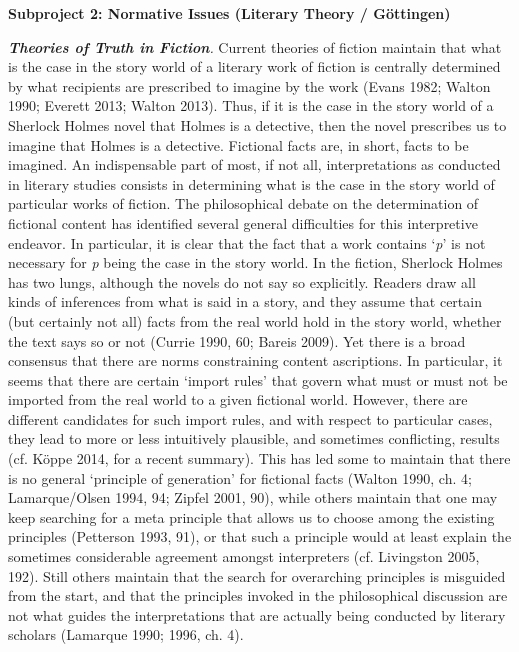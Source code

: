 
\vspace{.2cm}
\noindent\textbf{Subproject 2: Normative Issues (Literary Theory / G\"ottingen)}
\vspace{.2cm}

\noindent\textbf{\emph{Theories of Truth in Fiction}}\emph{.} Current theories of fiction maintain that what is the case in the story world of a literary work of fiction is centrally determined by what recipients are prescribed to imagine by the work (Evans 1982; Walton 1990; Everett 2013; Walton 2013). Thus, if it is the case in the story world of a Sherlock Holmes novel that Holmes is a detective, then the novel prescribes us to imagine that Holmes is a detective. Fictional facts are, in short, facts to be imagined. An indispensable part of most, if not all, interpretations as conducted in literary studies consists in determining what is the case in the story world of particular works of fiction. The philosophical debate on the determination of fictional content has identified several general difficulties for this interpretive endeavor. In particular, it is clear that the fact that a work contains `\emph{p}' is not necessary for \emph{p} being the case in the story world. In the fiction, Sherlock Holmes has two lungs, although the novels do not say so explicitly. Readers draw all kinds of inferences from what is said in a story, and they assume that certain (but certainly not all) facts from the real world hold in the story world, whether the text says so or not (Currie 1990, 60; Bareis 2009). Yet there is a broad consensus that there are norms constraining content ascriptions. In particular, it seems that there are certain `import rules' that govern what must or must not be imported from the real world to a given fictional world. However, there are different candidates for such import rules, and with respect to particular cases, they lead to more or less intuitively plausible, and sometimes conflicting, results (cf. K\"oppe 2014, for a recent summary). This has led some to maintain that there is no general `principle of generation' for fictional facts (Walton 1990, ch. 4; Lamarque/Olsen 1994, 94; Zipfel 2001, 90), while others maintain that one may keep searching for a meta principle that allows us to choose among the existing principles (Petterson 1993, 91), or that such a principle would at least explain the sometimes considerable agreement amongst interpreters (cf. Livingston 2005, 192). Still others maintain that the search for overarching principles is misguided from the start, and that the principles invoked in the philosophical discussion are not what guides the interpretations that are actually being conducted by literary scholars (Lamarque 1990; 1996, ch. 4).

